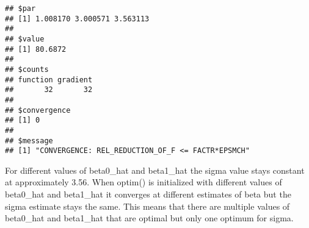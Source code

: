\documentclass[
  11pt,
]{article}
\begin{document}
\begin{verbatim}
## $par
## [1] 1.008170 3.000571 3.563113
## 
## $value
## [1] 80.6872
## 
## $counts
## function gradient 
##       32       32 
## 
## $convergence
## [1] 0
## 
## $message
## [1] "CONVERGENCE: REL_REDUCTION_OF_F <= FACTR*EPSMCH"
\end{verbatim}

For different values of beta0\_hat and beta1\_hat the sigma value stays
constant at approximately 3.56. When optim() is initialized with
different values of beta0\_hat and beta1\_hat it converges at different
estimates of beta but the sigma estimate stays the same. This means that
there are multiple values of beta0\_hat and beta1\_hat that are optimal
but only one optimum for sigma.
\end{document}
